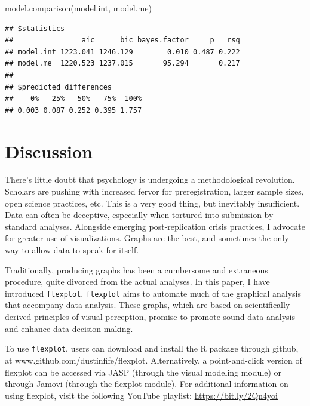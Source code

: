 \documentclass[
  english,
  man]{apa6}
\newenvironment{Shaded}{\begin{snugshade}}{\end{snugshade}}
\newcommand{\FunctionTok}[1]{\textcolor[rgb]{0.00,0.00,0.00}{#1}}
\newcommand{\NormalTok}[1]{#1}
\begin{document}
\small

\begin{Shaded}
\begin{Highlighting}[]
\FunctionTok{model.comparison}\NormalTok{(model.int, model.me)}
\end{Highlighting}
\end{Shaded}

\begin{verbatim}
## $statistics
##                aic      bic bayes.factor     p   rsq
## model.int 1223.041 1246.129        0.010 0.487 0.222
## model.me  1220.523 1237.015       95.294       0.217
## 
## $predicted_differences
##    0%   25%   50%   75%  100% 
## 0.003 0.087 0.252 0.395 1.757
\end{verbatim}

\normalsize

\hypertarget{discussion}{%
\section{Discussion}\label{discussion}}

There's little doubt that psychology is undergoing a methodological revolution. Scholars are pushing with increased fervor for preregistration, larger sample sizes, open science practices, etc. This is a very good thing, but inevitably insufficient. Data can often be deceptive, especially when tortured into submission by standard analyses. Alongside emerging post-replication crisis practices, I advocate for greater use of visualizations. Graphs are the best, and sometimes the only way to allow data to speak for itself.

Traditionally, producing graphs has been a cumbersome and extraneous procedure, quite divorced from the actual analyses. In this paper, I have introduced \texttt{flexplot}. \texttt{flexplot} aims to automate much of the graphical analysis that accompany data analysis. These graphs, which are based on scientifically-derived principles of visual perception, promise to promote sound data analysis and enhance data decision-making.

To use \texttt{flexplot}, users can download and install the R package through github, at www.github.com/dustinfife/flexplot. Alternatively, a point-and-click version of flexplot can be accessed via JASP (through the visual modeling module) or through Jamovi (through the flexplot module). For additional information on using flexplot, visit the following YouTube playlist: \url{https://bit.ly/2Qn4yoi}
\end{document}
